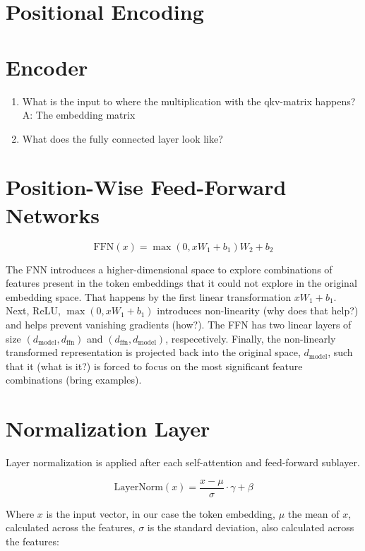 \documentclass{article}
\begin{document}
\section{Positional Encoding}

\section{Encoder}
\begin{enumerate}
	\item What is the input to where the multiplication with the qkv-matrix happens? A: The embedding matrix
	\item What does the fully connected layer look like?
\end{enumerate}

\section{Position-Wise Feed-Forward Networks}

\begin{equation}
	\text{FFN}(x) = \max(0, xW_1 + b_1)W_2 + b_2
\end{equation}

The FNN introduces a higher-dimensional space to explore combinations of features present in the token embeddings that it could not explore in the original embedding space. That happens by the first linear transformation \(xW_1 + b_1\). Next, ReLU, \(\max(0, xW_1 + b_1)\) introduces non-linearity (why does that help?) and helps prevent vanishing gradients (how?). The FFN has two linear layers of size \(\left(d_{\text{model}}, d_{\text{ffn}}\right)\) and \(\left(d_{\text{ffn}}, d_{\text{model}}\right)\), respecetively.
Finally, the non-linearly transformed representation is projected back into the original space, \(d_{\text{model}}\), such that it (what is it?) is forced to focus on the most significant feature combinations (bring examples).

\section{Normalization Layer}
Layer normalization is applied after each self-attention and feed-forward sublayer.

\begin{equation}
	\text{LayerNorm}(x) = \frac{x - \mu}{\sigma} \cdot \gamma + \beta
\end{equation}

Where \(x\) is the input vector, in our case the token embedding, \(\mu\) the mean of \(x\), calculated across the features, \(\sigma\) is the standard deviation, also calculated across the features:
\end{document}
